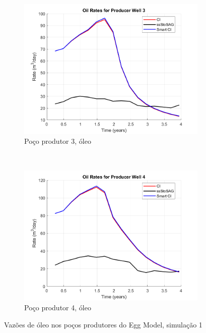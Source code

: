 \begin{figure}[!ht]
	\begin{subfigure}[b]{.3\textwidth}
		\includegraphics[width=\textwidth]{figs/resultadosEgg/imgsim1/EGG_OilWell3_Zoom}
		\caption{Po\c{c}o produtor 3, \'{o}leo}
		\label{EGG1_OilWell3}
	\end{subfigure}
	~
	\begin{subfigure}[b]{.3\textwidth}
		\includegraphics[width=\textwidth]{figs/resultadosEgg/imgsim1/EGG_OilWell4_Zoom}
		\caption{Po\c{c}o produtor 4, \'{o}leo}
		\label{EGG1_OilWell4}
	\end{subfigure}
\caption{Vaz\~{o}es de \'{o}leo nos po\c{c}os produtores do Egg Model, simula\c{c}\~{a}o 1}
\label{EGG1_OilRates}
\end{figure}

